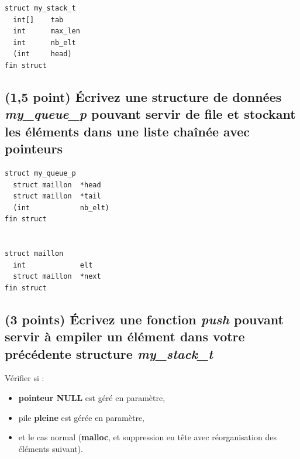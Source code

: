 \documentclass[11pt,a4paper]{article}
\begin{document}
\bigskip

\begin{center}
\begin{lstlisting}[style=algorithmique]
struct my_stack_t
  int[]    tab
  int      max_len
  int      nb_elt
  (int     head)
fin struct
\end{lstlisting}
\end{center}

\bigskip

\subsection{(1,5 point) \'Ecrivez une structure de données \og \textit{my\_queue\_p} \fg{} pouvant servir de file et stockant les éléments dans une liste chaînée avec pointeurs }

\bigskip

\begin{center}
\begin{lstlisting}[style=algorithmique]
struct my_queue_p
  struct maillon  *head
  struct maillon  *tail
  (int            nb_elt)
fin struct


struct maillon
  int             elt
  struct maillon  *next
fin struct
\end{lstlisting}
\end{center}




\newpage

\subsection{(3 points) \'Ecrivez une fonction \og \textit{push} \fg{} pouvant servir à empiler un élément dans votre précédente structure \og \textit{my\_stack\_t} \fg{} }

\bigskip

\begin{center}
Vérifier si :
\begin{itemize}
\item \textbf{pointeur NULL} est géré en paramètre,
\item pile \textbf{pleine} est gérée en paramètre,
\item et le cas normal (\textbf{malloc}, et suppression en tête avec réorganisation des éléments suivant).
\end{itemize}
\end{center}

\bigskip
\end{document}

